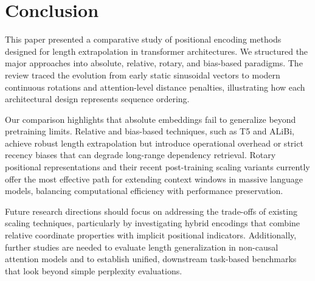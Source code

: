 \documentclass[conference]{IEEEtran}
\begin{document}
\section{Conclusion}
\label{sec:conclusion}

This paper presented a comparative study of positional encoding methods designed for length extrapolation in transformer architectures. We structured the major approaches into absolute, relative, rotary, and bias-based paradigms. The review traced the evolution from early static sinusoidal vectors to modern continuous rotations and attention-level distance penalties, illustrating how each architectural design represents sequence ordering.

Our comparison highlights that absolute embeddings fail to generalize beyond pretraining limits. Relative and bias-based techniques, such as T5 and ALiBi, achieve robust length extrapolation but introduce operational overhead or strict recency biases that can degrade long-range dependency retrieval. Rotary positional representations and their recent post-training scaling variants currently offer the most effective path for extending context windows in massive language models, balancing computational efficiency with performance preservation.

Future research directions should focus on addressing the trade-offs of existing scaling techniques, particularly by investigating hybrid encodings that combine relative coordinate properties with implicit positional indicators. Additionally, further studies are needed to evaluate length generalization in non-causal attention models and to establish unified, downstream task-based benchmarks that look beyond simple perplexity evaluations.
\end{document}
